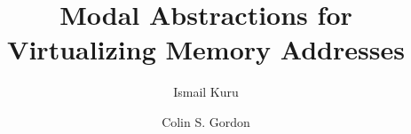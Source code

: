 \documentclass[acmsmall,screen,nonacm,review,anonymous]{acmart}
\begin{document}
\title{Modal Abstractions for Virtualizing Memory Addresses}
\author{Ismail Kuru}
\author{Colin S. Gordon}


\renewcommand{\shortauthors}{Kuru and Gordon}
\end{document}
